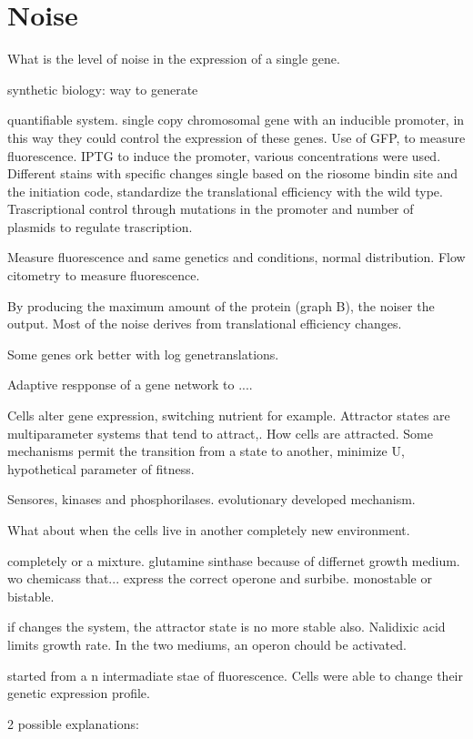 \section{Noise}
What is the level of noise in the expression of a single gene. 

synthetic biology: way to generate

quantifiable system. single copy chromosomal gene with an inducible promoter, in this way they could control the expression of these genes. Use of GFP, to measure fluorescence. IPTG to induce the promoter, various concentrations were used. Different stains with specific changes single based on the riosome bindin site and the initiation code, standardize the translational efficiency with the wild type.  Trascriptional control through mutations in the promoter and  number of plasmids to regulate trascription.

Measure fluorescence and same genetics and conditions, normal distribution. Flow citometry to measure fluorescence.

By producing the maximum amount of the protein (graph B), the noiser the output. Most of the noise derives from translational efficiency changes. 

Some genes ork better with log genetranslations.



Adaptive respponse of a gene network to ....

Cells alter gene expression, switching nutrient for example. Attractor states are multiparameter systems that tend to attract,. How cells are attracted. Some mechanisms permit the transition from a state to another, minimize U, hypothetical parameter of fitness.

Sensores, kinases and phosphorilases. evolutionary developed mechanism.

What about when the cells live in another completely new environment. 

completely or a mixture. glutamine sinthase because of differnet growth medium. wo chemicass that... express the correct operone and surbibe. monostable or bistable.

if changes the system, the attractor state is no more stable also. Nalidixic acid limits growth rate. In the two mediums, an operon chould be activated. 

started from a n intermadiate stae of fluorescence. Cells were able to change their genetic expression profile. 


2 possible explanations:

